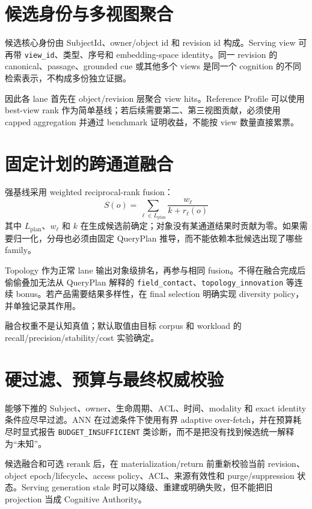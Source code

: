 \section{候选身份与多视图聚合}

候选核心身份由 SubjectId、owner/object id 和 revision id 构成。Serving view 可再带 \texttt{view\_id}、类型、序号和 embedding-space identity。同一 revision 的 canonical、passage、grounded cue 或其他多个 views 是同一个 cognition 的不同检索表示，不构成多份独立证据。

因此各 lane 首先在 object/revision 层聚合 view hits。Reference Profile 可以使用 best-view rank 作为简单基线；若后续需要第二、第三视图贡献，必须使用 capped aggregation 并通过 benchmark 证明收益，不能按 view 数量直接累票。

\section{固定计划的跨通道融合}

强基线采用 weighted reciprocal-rank fusion：
\[
S(o)=\sum_{\ell\in L_{\mathrm{plan}}}
\frac{w_{\ell}}{k+r_{\ell}(o)}
\]
其中 $L_{\mathrm{plan}}$、$w_{\ell}$ 和 $k$ 在生成候选前确定；对象没有某通道结果时贡献为零。如果需要归一化，分母也必须由固定 QueryPlan 推导，而不能依赖本批候选出现了哪些 family。

Topology 作为正常 lane 输出对象级排名，再参与相同 fusion。不得在融合完成后偷偷叠加无法从 QueryPlan 解释的 \texttt{field\_contact}、\texttt{topology\_innovation} 等连续 bonus。若产品需要结果多样性，在 final selection 明确实现 diversity policy，并单独记录其作用。

融合权重不是认知真值；默认取值由目标 corpus 和 workload 的 recall/precision/stability/cost 实验确定。

\section{硬过滤、预算与最终权威校验}

能够下推的 Subject、owner、生命周期、ACL、时间、modality 和 exact identity 条件应尽早过滤。ANN 在过滤条件下使用有界 adaptive over-fetch，并在预算耗尽时显式报告 \texttt{BUDGET\_INSUFFICIENT} 类诊断，而不是把没有找到候选统一解释为“未知”。

候选融合和可选 rerank 后，在 materialization/return 前重新校验当前 revision、object epoch/lifecycle、access policy、ACL、来源有效性和 purge/suppression 状态。Serving generation stale 时可以降级、重建或明确失败，但不能把旧 projection 当成 Cognitive Authority。

